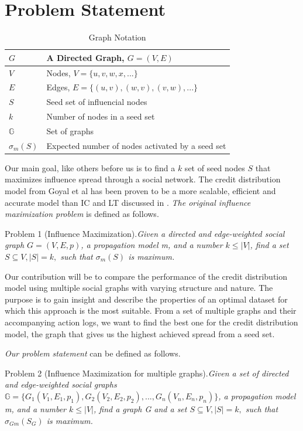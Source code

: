 \documentclass{acm_proc_article-sp}
\begin{document}
\section{Problem Statement}

\begin{table}
	\centering
	\begin{tabulary}{\linewidth}{|l|L|}
			\hline
			$G$ & A Directed Graph, $G = (V,E)$ \\\hline
			$V$ & Nodes, $V = \{u,v,w,x,...\}$ \\\hline
			$E$ & Edges, $E = \{(u, v),(w, v),(v,w),...\}$ \\\hline
			$S$ & Seed set of influencial nodes \\\hline
			$k$ & Number of nodes in a seed set \\\hline
			$\mathbb{G}$ & Set of graphs \\\hline
			$\sigma_m(S)$ & Expected number of nodes activated by a seed set \\\hline
	\end{tabulary}
	\caption{Graph Notation}
	\label{general-notation}
\end{table}

Our main goal, like others before us is to find a $k$ set of seed nodes $S$ that maximizes influence spread through a social network. The credit distribution model from Goyal et al has been proven to be a more scalable, efficient and accurate model than IC and LT discussed in \cite{kempe:maxspread}. \textit{The original influence maximization problem} is defined as follows.

\textsf{Problem 1 (Influence Maximization)}.\textit{Given a directed and edge-weighted social graph $ G = (V, E, p) $, a propagation model m, and a number $ k \leqslant |V| $, find a set $S \subseteq V , |S| = k,$ such that $\sigma_m (S)$ is maximum.}


Our contribution will be to compare the performance of the credit distribution model using multiple social graphs with varying structure and nature. The purpose is to gain insight and describe the properties of an optimal dataset for which this approach is the most suitable. From a set of multiple graphs and their accompanying action logs, we want to find the best one for the credit distribution model, the graph that gives us the highest achieved spread from a seed set.

\textit{Our problem statement} can be defined as follows.

\textsf{Problem 2 (Influence Maximization for multiple graphs)}.\textit{Given a set of directed and edge-weighted social graphs \\ $ \mathbb{G} = \{G_1(V_1, E_1,p_1), G_2(V_2, E_2, p_2),...,G_n(V_n, E_n,p_n) \} $, a propagation model m, and a number $ k \leqslant |V| $, find a graph G and a set $S \subseteq V , |S| = k,$ such that $\sigma_{Gm}(S_G)$ is maximum.}
\end{document}
